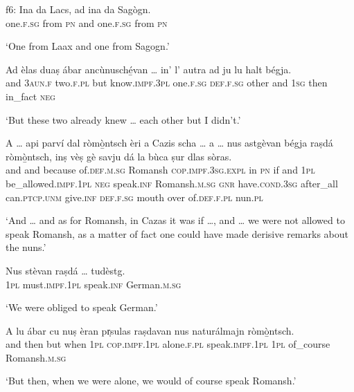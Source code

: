 \begin{linenumbers}
\gll   f6: Ina da Lacs, ad ina da Sagògn.\\
{}  one.\textsc{f.sg} from \textsc{pn} and one.\textsc{f.sg} from \textsc{pn}\\
\end{linenumbers}
\medskip
\glt `One from Laax and one from Sagogn.'
\medskip

\begin{linenumbers}
\gll    Ad èlas duaṣ ábar ancùnusché̱van … in’ l’ autra ad ju lu halt bégja.\\
and \textsc{3aun.f} two.\textsc{f.pl} but know.\textsc{impf.3pl} {} one.\textsc{f.sg}  \textsc{def.f.sg} other and \textsc{1sg} then in\_fact \textsc{neg}\\
\end{linenumbers}
\medskip
\glt `But these two already knew … each other but I didn’t.'
\medskip

\begin{linenumbers}
\gll    A … api parví dal ròmò̱ntsch èri a Cazis scha … a … nus astgèvan bégja raṣdá ròmò̱ntsch, inṣ vèṣ gè savju dá la bùca ṣur dlas sòras.\\
and {} and because of.\textsc{def.m.sg} Romansh \textsc{cop.impf.3sg.expl} in \textsc{pn} if {} and {} \textsc{1pl} be\_allowed.\textsc{impf.1pl} \textsc{neg} speak.\textsc{inf} Romansh.\textsc{m.sg} \textsc{gnr}  have.\textsc{cond.3sg} after\_all can.\textsc{ptcp.unm} give.\textsc{inf} \textsc{def.f.sg} mouth over of.\textsc{def.f.pl} nun.\textsc{pl}\\
\end{linenumbers}
\medskip
\glt `And … and as for Romansh, in Cazas it was if …, and … we were not allowed to speak Romansh, as a matter of fact one could have made derisive remarks about the nuns.'
\medskip

\begin{linenumbers}
\gll    Nus stèvan raṣdá … tudèstg.\\
 \textsc{1pl} must.\textsc{impf.1pl} speak.\textsc{inf} {} German.\textsc{m.sg}\\
\end{linenumbers}
\medskip
\glt `We were obliged to speak German.'
\medskip

\begin{linenumbers}
\gll    A lu ábar cu nuṣ èran pr̩sulas raṣdavan nus naturálmajn ròmò̱ntsch.\\
and then but when \textsc{1pl} \textsc{cop.impf.1pl} alone.\textsc{f.pl} speak.\textsc{impf.1pl}  \textsc{1pl} of\_course Romansh.\textsc{m.sg}\\
\end{linenumbers}
\medskip
\glt `But then, when we were alone, we would of course speak Romansh.'
\medskip

